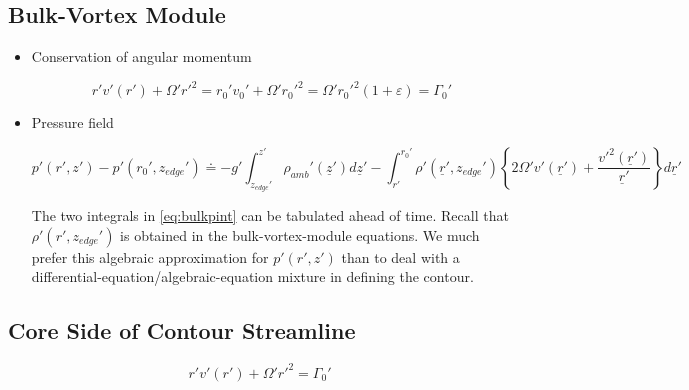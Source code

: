 \documentclass[preprint, prX]{revtex4}
\newcommand{\zedge}{z_{edge}}
\begin{document}
\subsection{Bulk-Vortex Module}

\begin{itemize}
\item Conservation of angular momentum

\begin{equation}
	r'v'(r') + \Omega' r'^2 = r_0' v_0' + \Omega'r_0'^2 = \Omega' r_0'^2(1+\varepsilon) = \Gamma_0'
\end{equation}

\item Pressure field

\begin{equation}
	p'(r',z') - p'(r_0',\zedge') \doteq - g' \int_{\zedge'}^{z'} \rho_{amb}'( \underline{z}') d \underline{z}' - \int_{r'}^{r_0'} \rho'(\underline{r}', \zedge')\left \{ 2 \Omega' v'(\underline{r}') + \frac{v'^2(\underline{r}')}{\underline{r}'} \right \} d\underline{r}'
	\label{eq:bulkpint}
\end{equation}

The two integrals in \eqref{eq:bulkpint} can be tabulated ahead of time. Recall that $\rho'(r',\zedge')$ is obtained in the bulk-vortex-module equations. We much prefer this algebraic approximation for $p'(r',z')$ than to deal with a differential-equation/algebraic-equation mixture in defining the contour.

\end{itemize} 

\subsection{Core Side of Contour Streamline}
\begin{equation}
	r'v'(r') + \Omega' r'^2 = \Gamma_0'
\end{equation}
\end{document}

